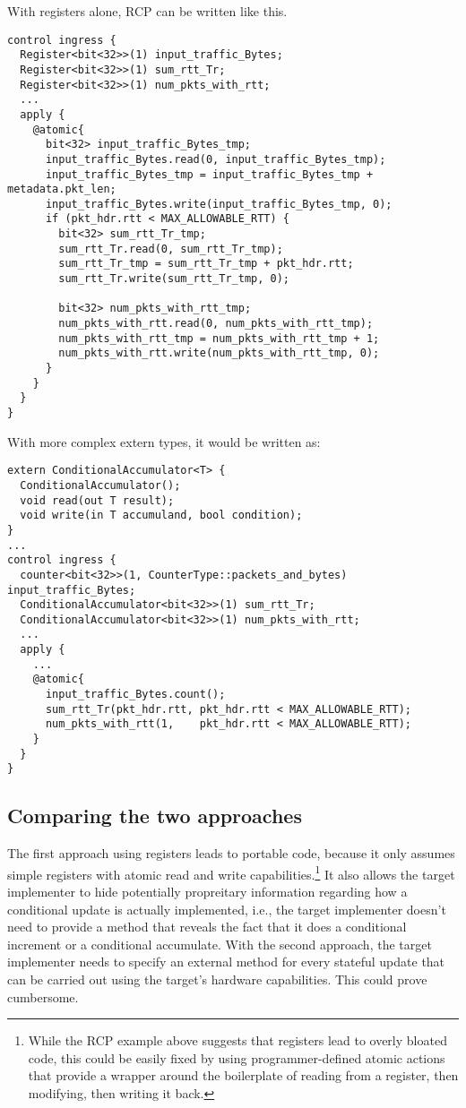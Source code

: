 With registers alone, RCP can be written like this.
\begin{verbatim}
control ingress {
  Register<bit<32>>(1) input_traffic_Bytes;
  Register<bit<32>>(1) sum_rtt_Tr;
  Register<bit<32>>(1) num_pkts_with_rtt;
  ...
  apply {
    @atomic{
      bit<32> input_traffic_Bytes_tmp;
      input_traffic_Bytes.read(0, input_traffic_Bytes_tmp);
      input_traffic_Bytes_tmp = input_traffic_Bytes_tmp + metadata.pkt_len;
      input_traffic_Bytes.write(input_traffic_Bytes_tmp, 0);
      if (pkt_hdr.rtt < MAX_ALLOWABLE_RTT) {
        bit<32> sum_rtt_Tr_tmp;
        sum_rtt_Tr.read(0, sum_rtt_Tr_tmp);
        sum_rtt_Tr_tmp = sum_rtt_Tr_tmp + pkt_hdr.rtt;
        sum_rtt_Tr.write(sum_rtt_Tr_tmp, 0);

        bit<32> num_pkts_with_rtt_tmp;
        num_pkts_with_rtt.read(0, num_pkts_with_rtt_tmp);
        num_pkts_with_rtt_tmp = num_pkts_with_rtt_tmp + 1;
        num_pkts_with_rtt.write(num_pkts_with_rtt_tmp, 0);
      }
    }
  }
}
\end{verbatim}

With more complex extern types, it would be written as:
\begin{verbatim}
extern ConditionalAccumulator<T> {
  ConditionalAccumulator();
  void read(out T result);
  void write(in T accumuland, bool condition);
}
...
control ingress {
  counter<bit<32>>(1, CounterType::packets_and_bytes) input_traffic_Bytes;
  ConditionalAccumulator<bit<32>>(1) sum_rtt_Tr;
  ConditionalAccumulator<bit<32>>(1) num_pkts_with_rtt;
  ...
  apply {
    ... 
    @atomic{
      input_traffic_Bytes.count();
      sum_rtt_Tr(pkt_hdr.rtt, pkt_hdr.rtt < MAX_ALLOWABLE_RTT);
      num_pkts_with_rtt(1,    pkt_hdr.rtt < MAX_ALLOWABLE_RTT);
    }
  }
}
\end{verbatim}

\subsection{Comparing the two approaches}
The first approach using registers leads to portable code, because it only
assumes simple registers with atomic read and write
capabilities.\footnote{While the RCP example above suggests that registers lead
to overly bloated code, this could be easily fixed by using programmer-defined
atomic actions that provide a wrapper around the boilerplate of reading from a
register, then modifying, then writing it back.} It also allows the target
implementer to hide potentially propreitary information regarding how a
conditional update is actually implemented, i.e., the target implementer
doesn't need to provide a method that reveals the fact that it does a
conditional increment or a conditional accumulate. With the second approach,
the target implementer needs to specify an external method for every stateful
update that can be carried out using the target's hardware capabilities. This
could prove cumbersome.

